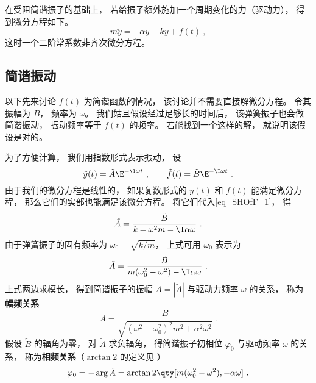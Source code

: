 

在受阻简谐振子的基础上， 若给振子额外施加一个周期变化的力（驱动力）， 得到微分方程如下。
\begin{equation}\label{eq_SHOfF_1}
m\ddot y = -\alpha \dot y - ky + f(t)~,
\end{equation}
这时一个二阶常系数非齐次微分方程。

\subsection{简谐振动}
以下先来讨论 $f(t)$ 为简谐函数的情况， 该讨论并不需要直接解微分方程。 令其振幅为 $B$， 频率为 $\omega$。 我们姑且假设经过足够长的时间后， 该弹簧振子也会做简谐振动， 振动频率等于 $f(t)$ 的频率。 若能找到一个这样的解， 就说明该假设是对的。

为了方便计算， 我们用指数形式表示振动， 设
\begin{equation}
\tilde y(t) = \tilde A\E^{-\I\omega t} ~,\qquad
\tilde f(t) = \tilde B\E^{-\I \omega t}~.
\end{equation}
由于我们的微分方程是线性的， 如果复数形式的 $y(t)$ 和 $f(t)$ 能满足微分方程， 那么它们的实部也能满足该微分方程。 将它们代入\autoref{eq_SHOfF_1}， 得
\begin{equation}
\tilde A =  \frac{\tilde B}{k -\omega^2 m - \I\alpha\omega}~.
\end{equation}
由于弹簧振子的固有频率为 $\omega_0 = \sqrt{k/m}$， 上式可用 $\omega_0$ 表示为
\begin{equation}
\tilde A = \frac{\tilde B}{m(\omega_0^2 - \omega^2) - \I\alpha\omega}~.
\end{equation}
上式两边求模长， 得到简谐振子的振幅 $A = |\tilde A|$ 与驱动力频率 $\omega$ 的关系， 称为\textbf{幅频关系}
\begin{equation}\label{eq_SHOfF_5}
A = \frac{B}{\sqrt{(\omega^2 - \omega_0^2)^2 m^2 + \alpha^2\omega^2}}~.
\end{equation}
假设 $\tilde B$ 的辐角为零， 对 $\tilde A$ 求负辐角， 得简谐振子初相位 $\varphi_0$ 与驱动频率 $\omega$ 的关系， 称为\textbf{相频关系}（$\arctan2$ 的定义见%
）
\begin{equation}\label{eq_SHOfF_6}
\varphi_0 = -\arg \tilde A = \arctan2 \qty[m(\omega_0^2 - \omega^2), -\alpha\omega]~.
\end{equation}

